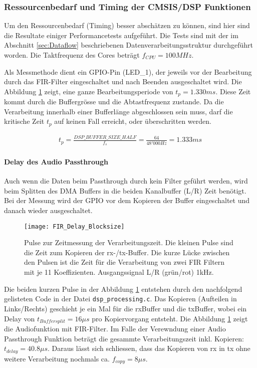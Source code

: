 \subsubsection{Ressourcenbedarf und Timing der CMSIS/DSP Funktionen}
\label{sec:DSP_Timing}

Um den Ressourcenbedarf (Timing) besser abschätzen zu können, sind hier sind die Resultate einiger Performancetests aufgeführt.
Die Tests sind mit der im Abschnitt \ref{sec:Dataflow} beschriebenen Datenverarbeitungsstruktur durchgeführt worden.
Die Taktfrequenz des Cores beträgt $f_{CPU}=100\si{MHz}$.

Als Messmethode dient ein GPIO-Pin (LED\_1), der jeweils vor der Bearbeitung durch das FIR-Filter eingeschaltet und nach Beenden ausgeschaltet wird. 
Die Abbildung \ref{pic:FIR_Delay_Blocksize} zeigt, eine ganze Bearbeitungsperiode von $t_p=1.330\si{ms}$.
Diese Zeit kommt durch die Buffergrösse und die Abtastfrequenz zustande.
Da die Verarbeitung innerhalb einer Bufferlänge abgeschlossen sein muss, darf die 
kritische Zeit $t_p$ auf keinen Fall erreicht, oder überschritten werden.

\begin{gather*}
	t_p=\frac{DSP\_BUFFER\_SIZE\_HALF}{f_s}=\frac{64}{48'000\si{Hz}}=1.333\si{ms}
\end{gather*} 


\paragraph{Delay des Audio Passthrough}

Auch wenn die Daten beim Passthrough durch kein Filter geführt werden, wird beim Splitten des DMA Buffers in die beiden Kanalbuffer (L/R) Zeit benötigt.
Bei der Messung wird der GPIO vor dem Kopieren der Buffer eingeschaltet und danach wieder ausgeschaltet.

\begin{figure}[H]
	\centering
	\texttt{[image: FIR\_Delay\_Blocksize]}
	\caption{Pulse zur Zeitmessung der Verarbeitungszeit. Die kleinen Pulse sind die Zeit zum Kopieren der rx-/tx-Buffer. Die kurze Lücke zwischen den Pulsen ist die Zeit für die Verarbeitung von zwei FIR Filtern mit je 11 Koeffizienten. Ausgangssignal L/R (grün/rot) 1kHz.}
	\label{pic:FIR_Delay_Blocksize}
\end{figure}

Die beiden kurzen Pulse in der Abbildung \ref{pic:FIR_Delay_Blocksize} entstehen durch den nachfolgend gelisteten Code in der Datei \texttt{dsp\_processing.c}.
Das Kopieren (Aufteilen in Links/Rechts) geschieht je ein Mal für die rxBuffer und die txBuffer, wobei ein Delay von $t_{Buffersplit}=16\mu\si{s}$ pro Kopiervorgang entsteht.
Die Abbildung \ref{pic:FIR_Delay_Blocksize} zeigt die Audiofunktion mit FIR-Filter. Im Falle der Verewndung einer Audio Passthrough Funktion beträgt die gesammte Verarbeitungszeit
inkl. Kopieren: $t_{delay}=40.8\mu\si{s}$. Daraus lässt sich schliessen, dass das Kopieren 
von rx in tx ohne weitere Verarbeitung nochmals ca. $f_{copy}=8\mu\si{s}$.

